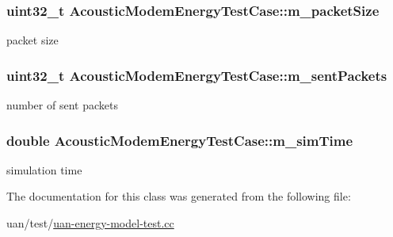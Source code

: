 \subsubsection[{\texorpdfstring{m\+\_\+packet\+Size}{m_packetSize}}]{\setlength{\rightskip}{0pt plus 5cm}uint32\+\_\+t Acoustic\+Modem\+Energy\+Test\+Case\+::m\+\_\+packet\+Size}\hypertarget{classAcousticModemEnergyTestCase_aad81603d0836ba952c5633e44e72dce8}{}\label{classAcousticModemEnergyTestCase_aad81603d0836ba952c5633e44e72dce8}


packet size 

\subsubsection[{\texorpdfstring{m\+\_\+sent\+Packets}{m_sentPackets}}]{\setlength{\rightskip}{0pt plus 5cm}uint32\+\_\+t Acoustic\+Modem\+Energy\+Test\+Case\+::m\+\_\+sent\+Packets}\hypertarget{classAcousticModemEnergyTestCase_a49500cd745308fd0b6fd3c607b13c624}{}\label{classAcousticModemEnergyTestCase_a49500cd745308fd0b6fd3c607b13c624}


number of sent packets 

\subsubsection[{\texorpdfstring{m\+\_\+sim\+Time}{m_simTime}}]{\setlength{\rightskip}{0pt plus 5cm}double Acoustic\+Modem\+Energy\+Test\+Case\+::m\+\_\+sim\+Time}\hypertarget{classAcousticModemEnergyTestCase_a1d9e3ca9e65e9a76630d1d17f509a932}{}\label{classAcousticModemEnergyTestCase_a1d9e3ca9e65e9a76630d1d17f509a932}


simulation time 



The documentation for this class was generated from the following file\+:\begin{DoxyCompactItemize}
\item 
uan/test/\hyperlink{uan-energy-model-test_8cc}{uan-\/energy-\/model-\/test.\+cc}\end{DoxyCompactItemize}
